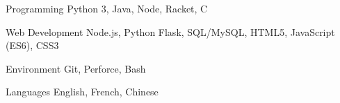 

\begin{cvskills}

  \cvskill
  {Programming} %
  {Python 3, Java, Node, Racket, C} %

  \cvskill
  {Web Development} %
  {Node.js, Python Flask, SQL/MySQL, HTML5, JavaScript (ES6), CSS3} %

  \cvskill
  {Environment} %
  {Git, Perforce, Bash} %

  \cvskill
  {Languages} %
  {English, French, Chinese} %

\end{cvskills}
